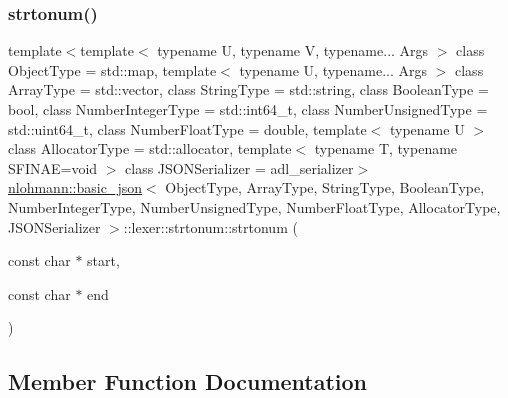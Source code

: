 \subsubsection{\texorpdfstring{strtonum()}{strtonum()}}
{\footnotesize\ttfamily template$<$template$<$ typename U, typename V, typename... Args $>$ class Object\+Type = std\+::map, template$<$ typename U, typename... Args $>$ class Array\+Type = std\+::vector, class String\+Type  = std\+::string, class Boolean\+Type  = bool, class Number\+Integer\+Type  = std\+::int64\+\_\+t, class Number\+Unsigned\+Type  = std\+::uint64\+\_\+t, class Number\+Float\+Type  = double, template$<$ typename U $>$ class Allocator\+Type = std\+::allocator, template$<$ typename T, typename S\+F\+I\+N\+A\+E=void $>$ class J\+S\+O\+N\+Serializer = adl\+\_\+serializer$>$ \\
\hyperlink{classnlohmann_1_1basic__json}{nlohmann\+::basic\+\_\+json}$<$ Object\+Type, Array\+Type, String\+Type, Boolean\+Type, Number\+Integer\+Type, Number\+Unsigned\+Type, Number\+Float\+Type, Allocator\+Type, J\+S\+O\+N\+Serializer $>$\+::lexer\+::strtonum\+::strtonum (\begin{DoxyParamCaption}\item[{const char $\ast$}]{start,  }\item[{const char $\ast$}]{end }\end{DoxyParamCaption})\hspace{0.3cm}{\ttfamily [inline]}}



\subsection{Member Function Documentation}
\mbox{\label{structnlohmann_1_1basic__json_1_1lexer_1_1strtonum_a1b8ad9fbc203c178fa8a7fcaebf396b7}} 
